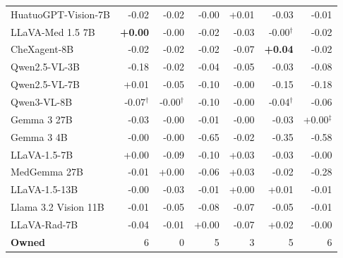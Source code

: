 \documentclass{article}
\providecommand{\DIFaddendFL}{} %
\DeclareRobustCommand{\DIFaddendFL}{\DIFOaddendFL \let\includegraphics\DIFOincludegraphics} %
\begin{document}
\begin{table}[htbp]
{\begin{tabular}{lrrrrrr}
HuatuoGPT-Vision-7B & \cellcolor{cfSlate2}-0.02 & \cellcolor{cfSlate1}-0.02 & \cellcolor{cfSlate1}-0.00 & \cellcolor{cfTerra1}+0.01 & \cellcolor{cfSlate2}-0.03 & \cellcolor{cfSlate1}-0.01 \\
LLaVA-Med 1.5 7B & \cellcolor{cfTerra1}\textbf{+0.00} & \cellcolor{cfSlate1}-0.00 & \cellcolor{cfSlate2}-0.02 & \cellcolor{cfSlate2}-0.03 & \cellcolor{cfSlate1}-0.00$^{\dagger}$ & \cellcolor{cfSlate1}-0.02 \\
CheXagent-8B & \cellcolor{cfSlate2}-0.02 & \cellcolor{cfSlate1}-0.02 & \cellcolor{cfSlate2}-0.02 & \cellcolor{cfSlate2}-0.07 & \cellcolor{cfTerra2}\textbf{+0.04} & \cellcolor{cfSlate2}-0.02 \\
Qwen2.5-VL-3B & \cellcolor{cfSlate3}-0.18 & \cellcolor{cfSlate1}-0.02 & \cellcolor{cfSlate2}-0.04 & \cellcolor{cfSlate2}-0.05 & \cellcolor{cfSlate2}-0.03 & \cellcolor{cfSlate2}-0.08 \\
Qwen2.5-VL-7B & \cellcolor{cfTerra1}+0.01 & \cellcolor{cfSlate2}-0.05 & \cellcolor{cfSlate2}-0.10 & \cellcolor{cfSlate1}-0.00 & \cellcolor{cfSlate3}-0.15 & \cellcolor{cfSlate3}-0.18 \\
Qwen3-VL-8B & \cellcolor{cfSlate2}-0.07$^{\dagger}$ & \cellcolor{cfSlate1}-0.00$^{\dagger}$ & \cellcolor{cfSlate2}-0.10 & \cellcolor{cfSlate1}-0.00 & \cellcolor{cfSlate2}-0.04$^{\dagger}$ & \cellcolor{cfSlate2}-0.06 \\
Gemma 3 27B & \cellcolor{cfSlate2}-0.03 & \cellcolor{cfSlate1}-0.00 & \cellcolor{cfSlate1}-0.01 & \cellcolor{cfSlate1}-0.00 & \cellcolor{cfSlate2}-0.03 & \cellcolor{cfTerra1}+0.00$^{\ddagger}$ \\
Gemma 3 4B & \cellcolor{cfSlate1}-0.00 & \cellcolor{cfSlate1}-0.00 & \cellcolor{cfSlate4}-0.65 & \cellcolor{cfSlate1}-0.02 & \cellcolor{cfSlate4}-0.35 & \cellcolor{cfSlate4}-0.58 \\
LLaVA-1.5-7B & \cellcolor{cfTerra1}+0.00 & \cellcolor{cfSlate2}-0.09 & \cellcolor{cfSlate2}-0.10 & \cellcolor{cfTerra2}+0.03 & \cellcolor{cfSlate2}-0.03 & \cellcolor{cfSlate1}-0.00 \\
MedGemma 27B & \cellcolor{cfSlate1}-0.01 & \cellcolor{cfTerra1}+0.00 & \cellcolor{cfSlate2}-0.06 & \cellcolor{cfTerra2}+0.03 & \cellcolor{cfSlate1}-0.02 & \cellcolor{cfSlate4}-0.28 \\
LLaVA-1.5-13B & \cellcolor{cfSlate1}-0.00 & \cellcolor{cfSlate2}-0.03 & \cellcolor{cfSlate1}-0.01 & \cellcolor{cfTerra1}+0.00 & \cellcolor{cfTerra1}+0.01 & \cellcolor{cfSlate1}-0.01 \\
Llama 3.2 Vision 11B & \cellcolor{cfSlate1}-0.01 & \cellcolor{cfSlate2}-0.05 & \cellcolor{cfSlate2}-0.08 & \cellcolor{cfSlate2}-0.07 & \cellcolor{cfSlate2}-0.05 & \cellcolor{cfSlate1}-0.01 \\
LLaVA-Rad-7B & \cellcolor{cfSlate2}-0.04 & \cellcolor{cfSlate1}-0.01 & \cellcolor{cfTerra1}+0.00 & \cellcolor{cfSlate2}-0.07 & \cellcolor{cfTerra2}+0.02 & \cellcolor{cfSlate1}-0.00 \\
\midrule
\textbf{Owned} & 6 & 0 & 5 & 3 & 5 & 6 \\
\bottomrule
\end{tabular}}
\DIFaddendFL \end{table}
\end{document}
